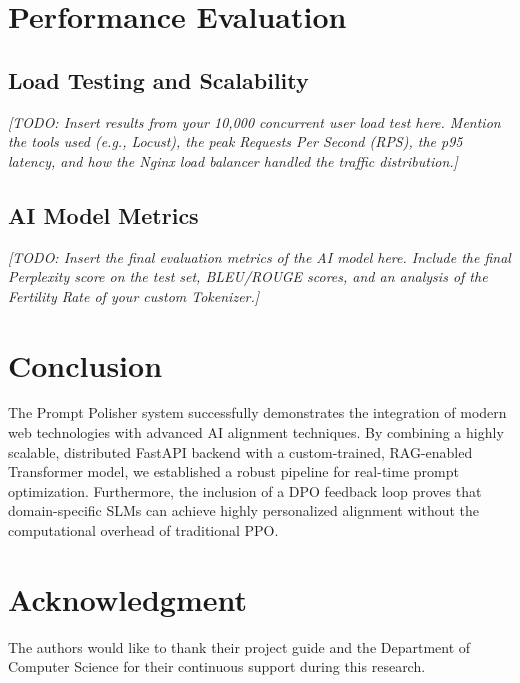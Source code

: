 \documentclass[10pt, conference]{IEEEtran}
\begin{document}
\section{Performance Evaluation}
\subsection{Load Testing and Scalability}
\textit{[TODO: Insert results from your 10,000 concurrent user load test here. Mention the tools used (e.g., Locust), the peak Requests Per Second (RPS), the p95 latency, and how the Nginx load balancer handled the traffic distribution.]}

\subsection{AI Model Metrics}
\textit{[TODO: Insert the final evaluation metrics of the AI model here. Include the final Perplexity score on the test set, BLEU/ROUGE scores, and an analysis of the Fertility Rate of your custom Tokenizer.]}

\section{Conclusion}
The Prompt Polisher system successfully demonstrates the integration of modern web technologies with advanced AI alignment techniques. By combining a highly scalable, distributed FastAPI backend with a custom-trained, RAG-enabled Transformer model, we established a robust pipeline for real-time prompt optimization. Furthermore, the inclusion of a DPO feedback loop proves that domain-specific SLMs can achieve highly personalized alignment without the computational overhead of traditional PPO.

\section*{Acknowledgment}
The authors would like to thank their project guide and the Department of Computer Science for their continuous support during this research.


\end{document}

